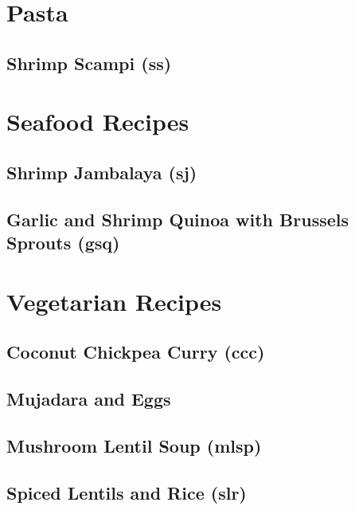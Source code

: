 \documentclass{report}
\begin{document}
\chapter{Pasta}
\newpage

\section{Shrimp Scampi (ss)}


\chapter{Seafood Recipes}
\newpage

\section{Shrimp Jambalaya (sj)}

\newpage


\section{Garlic and Shrimp Quinoa with Brussels Sprouts (gsq)}


\chapter{Vegetarian Recipes}
\newpage 
\section{Coconut Chickpea Curry (ccc)}

\newpage 
\section{Mujadara and Eggs}

\newpage

\section{Mushroom Lentil Soup (mlsp)}

\newpage
\section{Spiced Lentils and Rice (slr)}

\newpage
\end{document}
